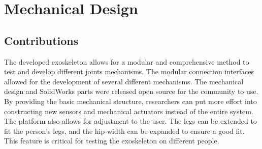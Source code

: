 
\chapter{Mechanical Design}











\section{Contributions}

The developed exoskeleton allows for a modular and comprehensive method to test and develop different joints mechanisms. The modular connection interfaces allowed for the development of several different mechanisms. The mechanical design and SolidWorks parts were released open source for the community to use. By providing the basic mechanical structure, researchers can put more effort into constructing new sensors and mechanical actuators instead of the entire system. The platform also allows for adjustment to the user. The legs can be extended to fit the person's legs, and the hip-width can be expanded to ensure a good fit. This feature is critical for testing the exoskeleton on different people.  

